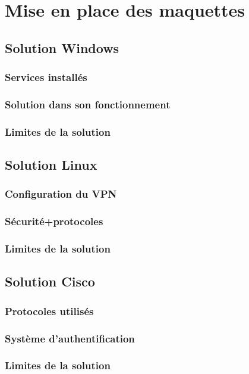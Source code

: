 \section{Mise en place des maquettes}
\subsection{Solution Windows}
\subsubsection{Services installés}
\subsubsection{Solution dans son fonctionnement}
\subsubsection{Limites de la solution}

\subsection{Solution Linux}
\subsubsection{Configuration du VPN}
\subsubsection{Sécurité+protocoles}
\subsubsection{Limites de la solution}

\subsection{Solution Cisco}
\subsubsection{Protocoles utilisés}
\subsubsection{Système d'authentification}
\subsubsection{Limites de la solution}

\pagebreak
